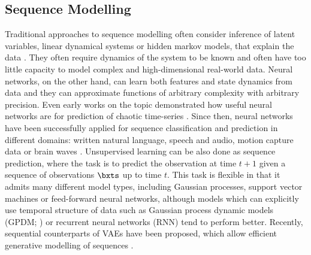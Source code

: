     \subsection{Sequence Modelling}
        Traditional approaches to sequence modelling often consider inference of latent variables, \eg linear dynamical systems or hidden markov models, that explain the data \citep{Bishop2006}.
        They often require dynamics of the system to be known and often have too little capacity to model complex and high-dimensional real-world data.
        Neural networks, on the other hand, can learn both features and state dynamics from data and they can approximate functions of arbitrary complexity with arbitrary precision.
        Even early works on the topic demonstrated how useful neural networks are for prediction of chaotic time-series \citep{Lapedes1988}.
        Since then, neural networks have been successfully applied for sequence classification and prediction in different domains: written natural language, speech and audio, motion capture data or brain waves \citep{Langkvist2014}. 
%
%
        Unsupervised learning can be also done as sequence prediction, where the task is to predict the observation at time $t+1$ given a sequence of observations $\bxts$ up to time $t$. This task is flexible in that it admits many different model types, including Gaussian processes, support vector machines or feed-forward neural networks, although models which can explicitly use temporal structure of data such as Gaussian process dynamic models (GPDM; \cite{Wang2008}) or recurrent neural networks (RNN) tend to perform better. Recently, sequential counterparts of VAEs have been proposed, which allow efficient generative modelling of sequences \citep{Fabius2015,Bayer2015,Karl2017}.
%
%
